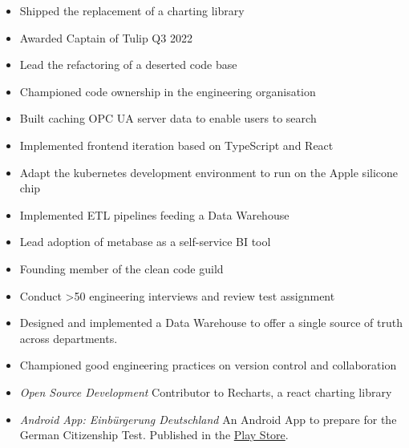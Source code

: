 \documentclass[10pt,a4paper,ragged2e,withhyper]{altacv}
\begin{document}
\begin{paracol}{2}

\begin{itemize}
\item Shipped the replacement of a charting library
\item Awarded Captain of Tulip Q3 2022
\item Lead the refactoring of a deserted code base
\item Championed code ownership in the engineering organisation
\item Built caching OPC UA server data to enable users to search
\item Implemented frontend iteration based on TypeScript and React
\item Adapt the kubernetes development environment to run on the Apple silicone chip
  \end{itemize}

\divider

\begin{itemize}
\item Implemented ETL pipelines feeding a Data Warehouse
\item Lead adoption of metabase as a self-service BI tool
\item Founding member of the clean code guild
\item Conduct >50 engineering interviews and review test assignment
\end{itemize}

\divider

\begin{itemize}
\item Designed and implemented a Data Warehouse to offer a single source of truth across departments.
\item Championed good engineering practices on version control and collaboration
\end{itemize}


\begin{itemize}
  \item \textit{Open Source Development} Contributor to Recharts, a react charting library
  \item \textit{Android App: Einbürgerung Deutschland}
  An Android App to prepare for the German Citizenship Test.
  Published in the \href{https://play.google.com/store/apps/details?id=com.nrieble.quizapp}{Play Store}.
\end{itemize}



\end{paracol}
\end{document}

